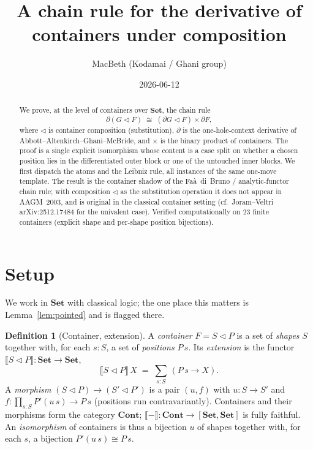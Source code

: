 \documentclass[11pt]{article}
\title{A chain rule for the derivative of containers under composition}
\author{MacBeth (Kodamai / Ghani group)}
\date{2026-06-12}
\theoremstyle{definition}
\newtheorem{definition}{Definition}
\newcommand{\Set}{\mathbf{Set}}
\newcommand{\Cont}{\mathbf{Cont}}
\newcommand{\ext}[1]{\llbracket #1 \rrbracket}
\newcommand{\tri}{\mathbin{\triangleleft}}
\newcommand{\pd}{\partial}
\begin{document}
\maketitle

\begin{abstract}
We prove, at the level of containers over $\Set$, the chain rule
\[
  \pd(G \tri F) \;\cong\; (\pd G \tri F) \times \pd F,
\]
where $\tri$ is container composition (substitution), $\pd$ is the
one-hole-context derivative of Abbott--Altenkirch--Ghani--McBride, and $\times$
is the binary product of containers. The proof is a single explicit
isomorphism whose content is a case split on whether a chosen position lies in
the differentiated outer block or one of the untouched inner blocks. We first
dispatch the atoms and the Leibniz rule, all instances of the same one-move
template. The result is the container shadow of the Fa\`a~di~Bruno / analytic-functor
chain rule; with composition $\tri$ as the substitution operation it does not
appear in AAGM~2003, and is original in the classical container setting (cf.\
Joram--Veltri arXiv:2512.17484 for the univalent case). Verified computationally
on $23$ finite containers (explicit shape and per-shape position bijections).
\end{abstract}

\section{Setup}

We work in $\Set$ with classical logic; the one place this matters is
Lemma~\ref{lem:pointed} and is flagged there.

\begin{definition}[Container, extension]
A \emph{container} $F = S \tri P$ is a set of \emph{shapes} $S$ together with,
for each $s : S$, a set of \emph{positions} $P\,s$. Its \emph{extension} is the
functor $\ext{S \tri P} : \Set \to \Set$,
\[
  \ext{S \tri P}\,X \;=\; \textstyle\sum_{s:S}\, (P\,s \to X).
\]
A \emph{morphism} $(S \tri P) \to (S' \tri P')$ is a pair $(u, f)$ with
$u : S \to S'$ and $f : \prod_{s:S} P'(u\,s) \to P\,s$ (positions run
contravariantly). Containers and their morphisms form the category $\Cont$;
$\ext{-} : \Cont \to [\Set,\Set]$ is fully faithful. An \emph{isomorphism} of
containers is thus a bijection $u$ of shapes together with, for each $s$, a
bijection $P'(u\,s) \cong P\,s$.
\end{definition}
\end{document}

